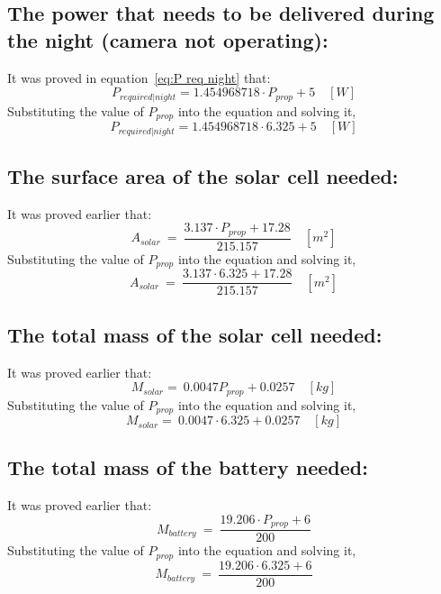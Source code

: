 \subsection{The power that needs to be delivered during the night (camera not operating):} \vspace{0.1cm}
It was proved in equation~\ref{eq:P req night} that:
\[ P_{required | night} = 1.454968718 \cdot P_{prop} + 5 \quad [W] \]
Substituting the value of $ P_{prop} $ into the equation and solving it,
\[ P_{required | night} = 1.454968718 \cdot 6.325 + 5 \quad [W] \]
\boxthree

\subsection{The surface area of the solar cell needed:} \vspace{0.1cm}
It was proved earlier that:
\[ A_{solar} \ = \ \frac{ 3.137 \cdot P_{prop} + 17.28 }{ 215.157 } \quad [m^2] \]
Substituting the value of $ P_{prop} $ into the equation and solving it,
\[ A_{solar} \ = \ \frac{ 3.137 \cdot 6.325 + 17.28 }{ 215.157 } \quad [m^2] \]
\boxfour

\subsection{The total mass of the solar cell needed:} \vspace{0.1cm}
It was proved earlier that:
\[ M_{solar} = \ 0.0047 P_{prop} + 0.0257  \quad [kg] \]
Substituting the value of $ P_{prop} $ into the equation and solving it,
\[ M_{solar} = \ 0.0047 \cdot 6.325 + 0.0257  \quad [kg] \]
\boxfive

\subsection{The total mass of the battery needed:} \vspace{0.1cm}
It was proved earlier that:
\[ M_{battery} \ = \ \frac{ 19.206 \cdot P_{prop} + 6 }{ 200 } \]
Substituting the value of $ P_{prop} $ into the equation and solving it,
\[ M_{battery} \ = \ \frac{ 19.206 \cdot 6.325 + 6 }{ 200 } \]
\boxsix
